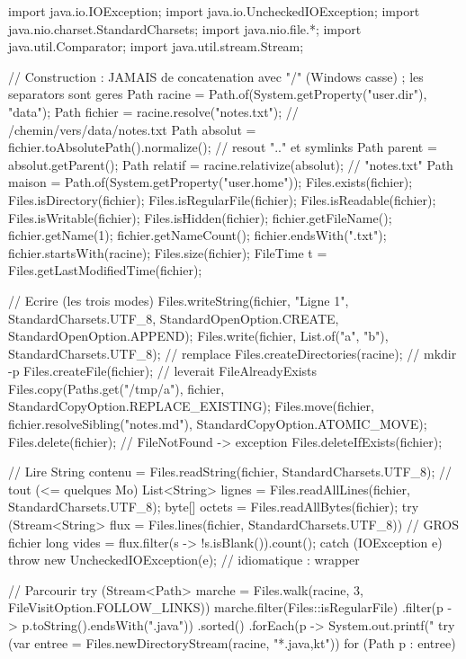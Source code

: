 \documentclass[12pt,a4paper,twoside,openright]{book}
\begin{document}
\begin{codejava}
import java.io.IOException;
import java.io.UncheckedIOException;
import java.nio.charset.StandardCharsets;
import java.nio.file.*;
import java.util.Comparator;
import java.util.stream.Stream;

// Construction : JAMAIS de concatenation avec "/" (Windows casse) ; les separators sont geres
Path racine = Path.of(System.getProperty("user.dir"), "data");
Path fichier = racine.resolve("notes.txt");            // /chemin/vers/data/notes.txt
Path absolut = fichier.toAbsolutePath().normalize();     // resout ".." et symlinks
Path parent = absolut.getParent();
Path relatif = racine.relativize(absolut);                // "notes.txt"
Path maison = Path.of(System.getProperty("user.home"));
Files.exists(fichier); Files.isDirectory(fichier); Files.isRegularFile(fichier);
Files.isReadable(fichier); Files.isWritable(fichier); Files.isHidden(fichier);
fichier.getFileName(); fichier.getName(1); fichier.getNameCount();
fichier.endsWith(".txt"); fichier.startsWith(racine);
Files.size(fichier);
FileTime t = Files.getLastModifiedTime(fichier);

// Ecrire (les trois modes)
Files.writeString(fichier, "Ligne 1\n", StandardCharsets.UTF_8,
        StandardOpenOption.CREATE, StandardOpenOption.APPEND);
Files.write(fichier, List.of("a", "b"), StandardCharsets.UTF_8);      // remplace
Files.createDirectories(racine);                                        // mkdir -p
Files.createFile(fichier);                                               // leverait FileAlreadyExists
Files.copy(Paths.get("/tmp/a"), fichier, StandardCopyOption.REPLACE_EXISTING);
Files.move(fichier, fichier.resolveSibling("notes.md"), StandardCopyOption.ATOMIC_MOVE);
Files.delete(fichier);                                                   // FileNotFound -> exception
Files.deleteIfExists(fichier);

// Lire
String contenu = Files.readString(fichier, StandardCharsets.UTF_8);   // tout (<= quelques Mo)
List<String> lignes = Files.readAllLines(fichier, StandardCharsets.UTF_8);
byte[] octets = Files.readAllBytes(fichier);
try (Stream<String> flux = Files.lines(fichier, StandardCharsets.UTF_8)) {   // GROS fichier
    long vides = flux.filter(s -> !s.isBlank()).count();
} catch (IOException e) { throw new UncheckedIOException(e); }              // idiomatique : wrapper

// Parcourir
try (Stream<Path> marche = Files.walk(racine, 3, FileVisitOption.FOLLOW_LINKS)) {
    marche.filter(Files::isRegularFile)
          .filter(p -> p.toString().endsWith(".java"))
          .sorted()
          .forEach(p -> System.out.printf("%
}
try (var entree = Files.newDirectoryStream(racine, "*.{java,kt}")) { for (Path p : entree) { } }


\end{codejava}
\end{document}
